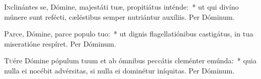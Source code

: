\documentclass[vesperale_romanum.tex]{subfiles}
\begin{document}
\oratio

\lettrine{I}{n}clinántes se, Dómine, majestáti tuæ, propitiátus inténde:~* ut qui divíno múnere sunt refécti, cæléstibus semper nutriántur auxíliis. Per Dóminum.



\oratio

\lettrine{P}{a}rce, Dómine, parce populo tuo:~* ut dignis flagellatiónibus castigátus, in tua miseratióne respíret. Per Dóminum.



\oratio

\lettrine{T}{u}ére Dómine pópulum tuum et ab ómnibus peccátis cleménter emúnda:~* quia nulla ei nocébit advérsitas, si nulla ei dominétur iníquitas.
Per Dóminum.

\biggerrule
\end{document}
